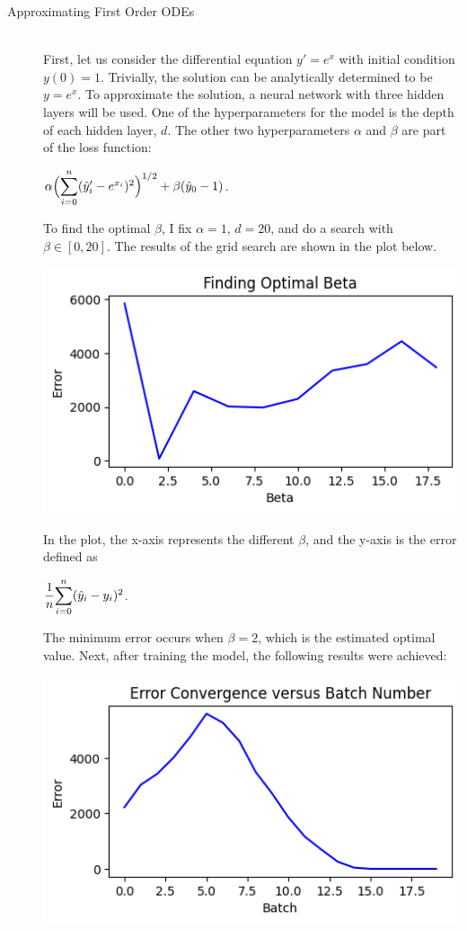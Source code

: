 \documentclass[12pt]{article}
\newcommand{\dsum}[2]{\mathlarger{\sum}_{#1}^{#2}}
\newcommand{\bgc}{\begin{center}}
\newcommand{\enc}{\end{center}}
\begin{document}
\begin{description}
    \item[Approximating First Order ODEs] \hfill \\
    First, let us consider the differential equation $y' = e^x$ with initial
    condition $y(0) = 1$. Trivially, the solution can be analytically
    determined to be $y = e^x$. To approximate the solution, a neural network
    with three hidden layers will be used. One of the hyperparameters for the
    model is the depth of each hidden layer, $d$. The other two hyperparameters
    $\alpha$ and $\beta$ are part of the loss function:
    \bgc 
    $\alpha\Bigl(\dsum{i=0}{n}(\hat{y}_i' -e^{x_i})^2\Bigr)^{1/2} + \beta(\hat{y}_0 - 1)$.
    \enc
    To find the optimal $\beta$, I fix $\alpha = 1$, $d = 20$, and do a search with
    $\beta\in[0, 20]$. The results of the grid search are shown in the plot
    below.\\
    \begin{minipage}{\linewidth}
        \centering
        \includegraphics[scale=.5]{images/figure1.png}
    \end{minipage}
    In the plot, the x-axis represents the different $\beta$, and the y-axis is
    the error defined as 
    \bgc 
    $\dfrac{1}{n}\dsum{i=0}{n}(\hat{y}_i - y_i)^2$.
    \enc
    The minimum error occurs when $\beta = 2$, which is the estimated optimal
    value. Next, after training the model, the following results were achieved: \\
    \begin{minipage}{\linewidth}
        \centering
        \includegraphics[scale=.5]{images/figure2.png}

\end{minipage}
\end{description}
\end{document}
